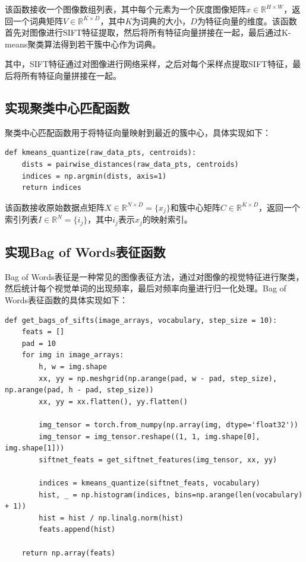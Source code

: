 该函数接收一个图像数组列表，其中每个元素为一个灰度图像矩阵$x\in\mathbb{R}^{H\times W}$，返回一个词典矩阵$V\in\mathbb{R}^{K\times D}$，其中$K$为词典的大小，$D$为特征向量的维度。该函数首先对图像进行SIFT特征提取，然后将所有特征向量拼接在一起，最后通过K-means聚类算法得到若干簇中心作为词典。

其中，SIFT特征通过对图像进行网络采样，之后对每个采样点提取SIFT特征，最后将所有特征向量拼接在一起。

\subsection{实现聚类中心匹配函数}

聚类中心匹配函数用于将特征向量映射到最近的簇中心，具体实现如下：

\begin{lstlisting}[style=Python]
def kmeans_quantize(raw_data_pts, centroids):
    dists = pairwise_distances(raw_data_pts, centroids)
    indices = np.argmin(dists, axis=1)
    return indices
\end{lstlisting}

该函数接收原始数据点矩阵$X\in\mathbb{R}^{N\times D}=\{x_j\}$和簇中心矩阵$C\in\mathbb{R}^{K\times D}$，返回一个索引列表$I\in\mathbb{R}^{N}=\{i_j\}$，其中$i_j$表示$x_j$的映射索引。

\subsection{实现Bag of Words表征函数}

Bag of Words表征是一种常见的图像表征方法，通过对图像的视觉特征进行聚类，然后统计每个视觉单词的出现频率，最后对频率向量进行归一化处理。Bag of Words表征函数的具体实现如下：

\begin{lstlisting}[style=Python]
def get_bags_of_sifts(image_arrays, vocabulary, step_size = 10):
    feats = []
    pad = 10
    for img in image_arrays:
        h, w = img.shape
        xx, yy = np.meshgrid(np.arange(pad, w - pad, step_size), np.arange(pad, h - pad, step_size))
        xx, yy = xx.flatten(), yy.flatten()
        
        img_tensor = torch.from_numpy(np.array(img, dtype='float32'))
        img_tensor = img_tensor.reshape((1, 1, img.shape[0], img.shape[1]))
        siftnet_feats = get_siftnet_features(img_tensor, xx, yy)

        indices = kmeans_quantize(siftnet_feats, vocabulary)
        hist, _ = np.histogram(indices, bins=np.arange(len(vocabulary) + 1))
        hist = hist / np.linalg.norm(hist)
        feats.append(hist)
    
    return np.array(feats)
\end{lstlisting}

